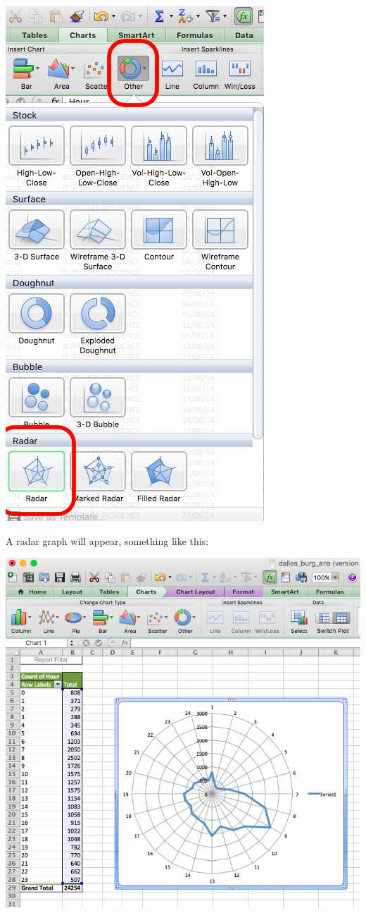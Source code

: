 \documentclass[]{book}
\theoremstyle{definition}
\theoremstyle{definition}
\theoremstyle{definition}
\theoremstyle{remark}
\begin{document}
\includegraphics{imgs/hr_radar_1.png}

A radar graph will appear, something like this:

\includegraphics{imgs/wrong_radar.png}
\end{document}

